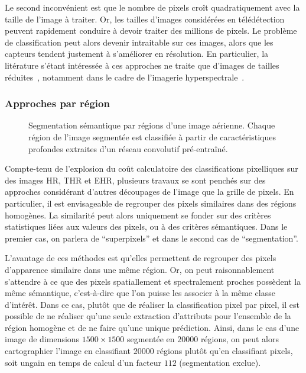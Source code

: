 Le second inconvénient est que le nombre de pixels croît quadratiquement avec la taille de l'image à traiter. Or, les tailles d'images considérées en télédétection peuvent rapidement conduire à devoir traiter des millions de pixels. Le problème de classification peut alors devenir intraitable sur ces images, alors que les capteurs tendent justement à s'améliorer en résolution. En particulier, la litérature s'étant intéressée à ces approches ne traite que d'images de tailles réduites~\cite{nogueira_learning_2016}, notamment dans le cadre de l'imagerie hyperspectrale~\cite{fauvel_advances_2013}.

\subsubsection{Approches par région}

\begin{figure}
\resizebox{\textwidth}{!}{%

}
\caption{Segmentation sémantique par régions d'une image aérienne. Chaque région de l'image segmentée est classifiée à partir de caractéristiques profondes extraites d'un réseau convolutif pré-entraîné.}
\label{fig:framework}
\end{figure}

Compte-tenu de l'explosion du coût calculatoire des classifications pixelliques sur des images \gls{HR}, \gls{THR} et \gls{EHR}, plusieurs travaux se sont penchés sur des approches considérant d'autres découpages de l'image que la grille de pixels. En particulier, il est envisageable de regrouper des pixels similaires dans des régions homogènes. La similarité peut alors uniquement se fonder sur des critères statistiques liées aux valeurs des pixels, ou à des critères sémantiques. Dans le premier cas, on parlera de ``superpixels'' et dans le second cas de ``segmentation''.

L'avantage de ces méthodes est qu'elles permettent de regrouper des pixels d'apparence similaire dans une même région. Or, on peut raisonnablement s'attendre à ce que des pixels spatiallement et spectralement proches possèdent la même sémantique, c'est-à-dire que l'on puisse les associer à la même classe d'intérêt. Dans ce cas, plutôt que de réaliser la classification pixel par pixel, il est possible de ne réaliser qu'une seule extraction d'attributs pour l'ensemble de la région homogène et de ne faire qu'une unique prédiction. Ainsi, dans le cas d'une image de dimensions $1500\times1500$ segmentée en $20 000$ régions, on peut alors cartographier l'image en classifiant $20 000$ régions plutôt qu'en classifiant  pixels, soit ungain en temps de calcul d'un facteur $112$ (segmentation exclue).

